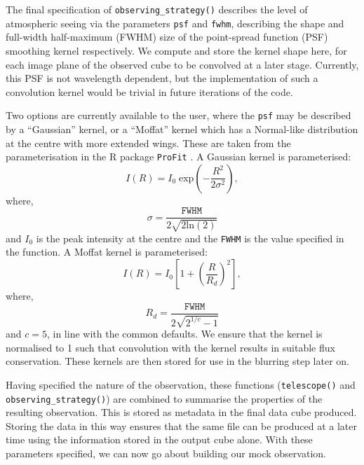 \documentclass[
  journal=pasa,
  manuscript=research-paper, %
  year=2020,
  volume=37,
]{cup-journal}
\newcommand{\telescope}[1]{\texttt{telescope()}#1}
\newcommand{\observingstrategy}[1]{\texttt{observing\_strategy()}#1}
\begin{document}
The final specification of \observingstrategy{} describes the level of atmospheric seeing via the parameters \texttt{psf} and \texttt{fwhm}, describing the shape and full-width half-maximum (FWHM) size of the point-spread function (PSF) smoothing kernel respectively. 
We compute and store the kernel shape here, for each image plane of the observed cube to be convolved at a later stage. 
Currently, this PSF is not wavelength dependent, but the implementation of such a convolution kernel would be trivial in future iterations of the code.

Two options are currently available to the user, where the \texttt{psf} may be described by a ``Gaussian'' kernel, or a ``Moffat'' kernel \citep{Moffat1969APhotometry} which has a Normal-like distribution at the centre with more extended wings. 
These are taken from the parameterisation in the R package \texttt{ProFit} \citep{Robotham2017ProFit:Images}. A Gaussian kernel is parameterised:
\begin{equation}
    I(R) = I_0 \; \text{exp}\left(- \frac{R^2}{2 \sigma^2}\right),
\end{equation}
where,
\begin{equation}
    \sigma = \frac{\texttt{FWHM}}{2 \sqrt{2\text{ln}(2)}}
\end{equation}
and $I_0$ is the peak intensity at the centre and the \texttt{FWHM} is the value specified in the function. A Moffat kernel is parameterised:
\begin{equation}
I(R) = I_0 \left[ 1 + \left(\frac{R}{R_d}\right)^2 \right],
\end{equation}
where,
\begin{equation}
    R_d = \frac{\texttt{FWHM}}{2\sqrt{2^{1/c} - 1}}
\end{equation}
and $c = 5$, in line with the common defaults.
We ensure that the kernel is normalised to 1 such that convolution with the kernel results in suitable flux conservation.
These kernels are then stored for use in the blurring step later on. 

\vspace{0.5cm}

Having specified the nature of the observation, these functions (\telescope{} and \observingstrategy) are combined to summarise the properties of the resulting observation. 
This is stored as metadata in the final data cube produced.
Storing the data in this way ensures that the same file can be produced at a later time using the information stored in the output cube alone. 
With these parameters specified, we can now go about building our mock observation. 
\end{document}
